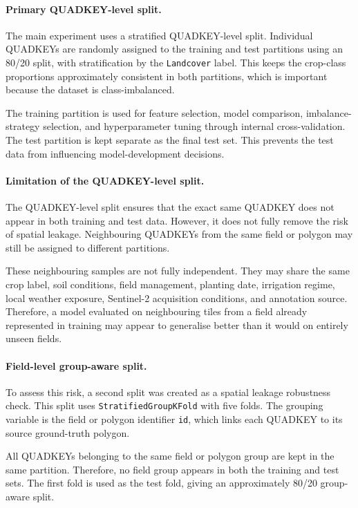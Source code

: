 \paragraph{Primary QUADKEY-level split.}
The main experiment uses a stratified QUADKEY-level split. Individual
QUADKEYs are randomly assigned to the training and test partitions using an
80/20 split, with stratification by the \texttt{Landcover} label. This keeps
the crop-class proportions approximately consistent in both partitions, which
is important because the dataset is class-imbalanced.

The training partition is used for feature selection, model comparison,
imbalance-strategy selection, and hyperparameter tuning through internal
cross-validation. The test partition is kept separate as the final test
set. This prevents the test data from influencing model-development
decisions.

\paragraph{Limitation of the QUADKEY-level split.}
The QUADKEY-level split ensures that the exact same QUADKEY does not appear
in both training and test data. However, it does not fully remove the risk of
spatial leakage. Neighbouring QUADKEYs from the same field or polygon may
still be assigned to different partitions.

These neighbouring samples are not fully independent. They may share the same
crop label, soil conditions, field management, planting date, irrigation
regime, local weather exposure, Sentinel-2 acquisition conditions, and
annotation source. Therefore, a model evaluated on neighbouring tiles from a
field already represented in training may appear to generalise better than it
would on entirely unseen fields.

\paragraph{Field-level group-aware split.}
To assess this risk, a second split was created as a spatial leakage
robustness check. This split uses \texttt{StratifiedGroupKFold} with five
folds. The grouping variable is the field or polygon identifier \texttt{id},
which links each QUADKEY to its source ground-truth polygon.

All QUADKEYs belonging to the same field or polygon group are kept in the
same partition. Therefore, no field group appears in both the training and
test sets. The first fold is used as the test fold, giving an
approximately 80/20 group-aware split.

